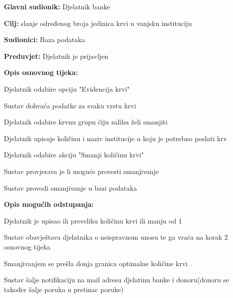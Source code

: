 \noindent {}
					\begin{packed_item}
	
						\item \textbf{Glavni sudionik: }Djelatnik banke
						\item \textbf{Cilj:} slanje određenog broja jedinica krvi u vanjsku instituciju
						\item \textbf{Sudionici:} Baza podataka
						\item \textbf{Preduvjet:} Djelatnik je prijavljen
						\item \textbf{Opis osnovnog tijeka:}
						
						\item[] \begin{packed_enum}
							
							\item Djelatnik odabire opciju "Evidencija krvi"
							\item Sustav dohvaća podatke za svaku vrstu krvi
							\item Djelatnik odabire krvnu grupu čiju zalihu želi smanjiti
							\item Djelatnik upisuje količinu i naziv institucije u koju je potrebno poslati krv
							\item Djelatnik odabire akciju "Smanji količinu krvi"
							\item Sustav provjerava je li moguće provesti smanjivanje
							\item Sustav provodi smanjivanje u bazi podataka
						\end{packed_enum}
						\item  \textbf{Opis mogućih odstupanja:}
						
						\item[] \begin{packed_item}
							\item[4.a] Djelatnik je upisao ili preveliku količinu krvi ili manju od 1				
							\item[] \begin{packed_enum}
								
								\item  Sustav obavještava djelatnika o neispravnom unosu te ga vraća na korak 2 osnovnog tijeka
									\end{packed_enum}
							\item[5.a] Smanjivanjem se prešla donja granica optimalne količine krvi
							\item[] \begin{packed_enum}
								
								\item  Sustav šalje notifikaciju na mail adresu djelatinu banke i donoru(donoru se također šalje poruka u pretinac poruke)
							 

								
									\end{packed_enum}
								\end{packed_item}			
									
									
									
					\end{packed_item}
				


